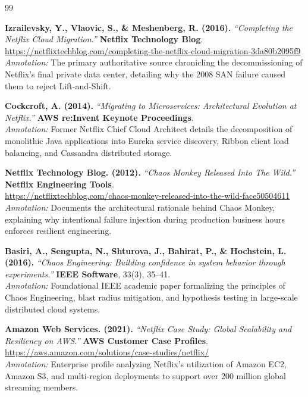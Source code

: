 \documentclass[11pt,a4paper]{article}
\begin{document}
\begin{thebibliography}{99}
\small \sloppy

\textbf{Izrailevsky, Y., Vlaovic, S., \& Meshenberg, R. (2016).} \textit{``Completing the Netflix Cloud Migration.''} \textbf{Netflix Technology Blog}.\\
\url{https://netflixtechblog.com/completing-the-netflix-cloud-migration-3da80b2095f9}\\
\textit{Annotation:} The primary authoritative source chronicling the decommissioning of Netflix's final private data center, detailing why the 2008 SAN failure caused them to reject Lift-and-Shift.

\textbf{Cockcroft, A. (2014).} \textit{``Migrating to Microservices: Architectural Evolution at Netflix.''} \textbf{AWS re:Invent Keynote Proceedings}.\\
\textit{Annotation:} Former Netflix Chief Cloud Architect details the decomposition of monolithic Java applications into Eureka service discovery, Ribbon client load balancing, and Cassandra distributed storage.

\textbf{Netflix Technology Blog. (2012).} \textit{``Chaos Monkey Released Into The Wild.''} \textbf{Netflix Engineering Tools}.\\
\url{https://netflixtechblog.com/chaos-monkey-released-into-the-wild-face50504611}\\
\textit{Annotation:} Documents the architectural rationale behind Chaos Monkey, explaining why intentional failure injection during production business hours enforces resilient engineering.

\textbf{Basiri, A., Sengupta, N., Shturova, J., Bahirat, P., \& Hochstein, L. (2016).} \textit{``Chaos Engineering: Building confidence in system behavior through experiments.''} \textbf{IEEE Software}, 33(3), 35--41.\\
\textit{Annotation:} Foundational IEEE academic paper formalizing the principles of Chaos Engineering, blast radius mitigation, and hypothesis testing in large-scale distributed cloud systems.

\textbf{Amazon Web Services. (2021).} \textit{``Netflix Case Study: Global Scalability and Resiliency on AWS.''} \textbf{AWS Customer Case Profiles}.\\
\url{https://aws.amazon.com/solutions/case-studies/netflix/}\\
\textit{Annotation:} Enterprise profile analyzing Netflix's utilization of Amazon EC2, Amazon S3, and multi-region deployments to support over 200 million global streaming members.


\end{thebibliography}
\end{document}
